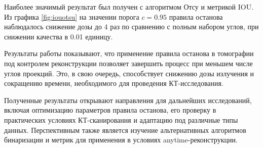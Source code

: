 Наиболее значимый результат был получен с алгоритмом Отсу и метрикой IOU. Из графика \ref*{fig:iouotsu} на значении порога \(c = 0.95\) правила останова наблюдалось снижение дозы до 4 раз по сравнению с полным набором углов, при снижении качества в 0.01 единицу.

Результаты работы показывают, что применение правила останова в томографии под контролем реконструкции позволяет завершить процесс при меньшем числе углов проекций. Это, в свою очередь, способствует снижению дозы излучения и сокращению времени, необходимого для проведения КТ-исследования.

Полученные результаты открывают направления для дальнейших исследований, включая оптимизацию параметров правила останова, его проверку в практических условиях КТ-сканирования и адаптацию под различные типы данных. Перспективным также является изучение альтернативных алгоритмов бинаризации и метрик для применения в условиях anytime-реконструкции.